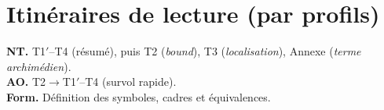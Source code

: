 \section{Itinéraires de lecture (par profils)}
\noindent
\textbf{NT.} T1$'$–T4 (résumé), puis T2 (\emph{bound}), T3 (\emph{localisation}), Annexe (\emph{terme archimédien}).\\
\textbf{AO.} T2$\rightarrow$T1$'$–T4 (survol rapide).\\
\textbf{Form.} Définition des symboles, cadres et équivalences.
